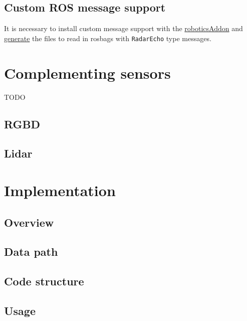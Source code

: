 \subsection{Custom ROS message
support}\label{custom-ros-message-support}

It is necessary to install custom message support with the
\href{https://www.mathworks.com/help/robotics/ref/roboticsaddons.html}{roboticsAddon}
and
\href{https://www.mathworks.com/help/robotics/ug/create-custom-messages-from-ros-package.html}{generate}
the files to read in rosbags with \texttt{RadarEcho} type messages.

\section{Complementing sensors}\label{complementing-sensors}

TODO

\subsection{RGBD}\label{rgbd}

\subsection{Lidar}\label{lidar}

\section{Implementation}\label{implementation-1}

\subsection{Overview}\label{overview}

\subsection{Data path}\label{data-path}

\subsection{Code structure}\label{code-structure}

\subsection{Usage}\label{usage}

